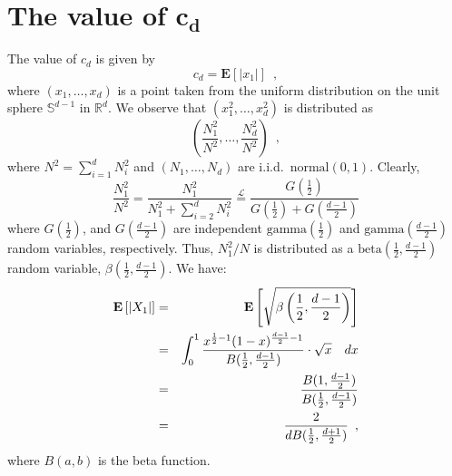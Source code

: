 \documentclass[charterfonts,lotsofwhite]{patmorin}
\newcommand{\E}{\mathbf{E}}
\begin{document}





\appendix
\section{The value of $\mathbf{c_d}$}

The value of $c_d$ is given by
\[
  c_d = \E \left[|x_1| \right] \enspace ,
\]
where $(x_1,\ldots,x_d)$ is a point taken from the uniform
distribution on the unit sphere $\mathbb{S}^{d-1}$ in $\mathbb{R}^d$.
We observe that $(x_1^2,\ldots,x_d^2)$ is distributed as 
\[
\left(\frac{N_1^2}{N^2},\ldots,\frac{N_d^2}{N^2}\right) \enspace ,
\]
where $N^2=\sum_{i=1}^d N_i^2$ and $(N_1,\ldots,N_d)$ are i.i.d.\
$\mathrm{normal}(0,1)$.  Clearly,
\[
\frac{N_1^2}{N^2} = \frac{N_1^2}{N_1^2+\sum_{i=2}^dN_i^2}
  \stackrel{\mathcal{L}}{=} \frac{G(\frac{1}{2})}{G(\frac{1}{2})+G(\frac{d-1}{2})}
\]
where $G(\frac{1}{2})$, and $G(\frac{d-1}{2})$ are independent
$\mathrm{gamma}(\frac{1}{2})$ and $\mathrm{gamma}(\frac{d-1}{2})$
random variables, respectively.  Thus, $N_1^2/N$ is distributed as a
$\mathrm{beta}(\frac{1}{2},\frac{d-1}{2})$ random variable,
$\beta(\frac{1}{2},\frac{d-1}{2})$.  We have:
\begin{eqnarray*}
\E\left[|X_1|\right]
 & = & \E\left[\sqrt{\beta\left(\frac{1}{2},\frac{d-1}{2}\right)}\right] \\
 & = & \int_0^1\frac{x^{\frac{1}{2}-1}(1-x)^{\frac{d-1}{2}-1}}
                    {B(\frac{1}{2},\frac{d-1}{2})}\cdot\sqrt{x} \quad dx\\
 & = & \frac{B(1,\frac{d-1}{2})}{B(\frac{1}{2},\frac{d-1}{2})}\\
\comment{ & = & d\cdot 
       \frac{\Gamma(\frac{d-1}{2})}
            {\Gamma(\frac{d+1}{2})} \cdot
       \frac{\Gamma(\frac{d}{2})}
            {\Gamma(\frac{1}{2})\cdot\Gamma(\frac{d-1}{2})} \\
 & = & \frac{d\Gamma(\frac{d}{2})}
            {\Gamma(\frac{1}{2})\cdot\Gamma(\frac{d+1}{2})} \\ 
 & = & \frac{2\Gamma(\frac{d}{2}+1)}
            {\Gamma(\frac{1}{2})\cdot\Gamma(\frac{d+1}{2})} \\
}
 & = & \frac{2}{dB(\frac{1}{2},\frac{d+1}{2})} \enspace , 
\end{eqnarray*}
where $B(a,b)$ is the beta function.
\end{document}
